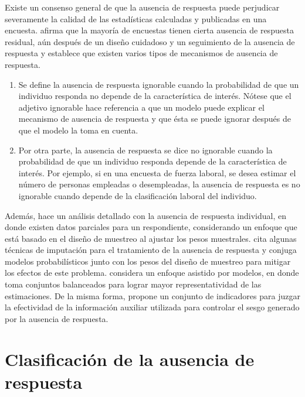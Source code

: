 \documentclass[
  10pt,
  spanish,
]{book}
\providecommand{\tightlist}{%
  \setlength{\itemsep}{0pt}\setlength{\parskip}{0pt}}
\begin{document}
Existe un consenso general de que la ausencia de respuesta puede perjudicar severamente la calidad de las estadísticas calculadas y publicadas en una encuesta. \citet{Lohr_2019} afirma que la mayoría de encuestas tienen cierta ausencia de respuesta residual, aún después de un diseño cuidadoso y un seguimiento de la ausencia de respuesta y establece que existen varios tipos de mecanismos de ausencia de respuesta.

\begin{enumerate}
\def\labelenumi{\arabic{enumi}.}
\tightlist
\item
  Se define la ausencia de respuesta ignorable cuando la probabilidad de que un individuo responda no depende de la característica de interés. Nótese que el adjetivo ignorable hace referencia a que un modelo puede explicar el mecanismo de ausencia de respuesta y que ésta se puede ignorar después de que el modelo la toma en cuenta.
\item
  Por otra parte, la ausencia de respuesta se dice no ignorable cuando la probabilidad de que un individuo responda depende de la característica de interés. Por ejemplo, si en una encuesta de fuerza laboral, se desea estimar el número de personas empleadas o desempleadas, la ausencia de respuesta es no ignorable cuando depende de la clasificación laboral del individuo.
\end{enumerate}

Además, \citet[capítulo 9]{Lumley_2010} hace un análisis detallado con la ausencia de respuesta individual, en donde existen datos parciales para un respondiente, considerando un enfoque que está basado en el diseño de muestreo al ajustar los pesos muestrales. \citet[capítulo 5]{Fuller} cita algunas técnicas de imputación para el tratamiento de la ausencia de respuesta y conjuga modelos probabilísticos junto con los pesos del diseño de muestreo para mitigar los efectos de este problema. \citet{Sar1} considera un enfoque asistido por modelos, en donde toma conjuntos balanceados para lograr mayor representatividad de las estimaciones. De la misma forma, \citet{Sar2} propone un conjunto de indicadores para juzgar la efectividad de la información auxiliar utilizada para controlar el sesgo generado por la ausencia de respuesta.

\hypertarget{clasificaciuxf3n-de-la-ausencia-de-respuesta}{%
\section{Clasificación de la ausencia de respuesta}\label{clasificaciuxf3n-de-la-ausencia-de-respuesta}}
\end{document}
